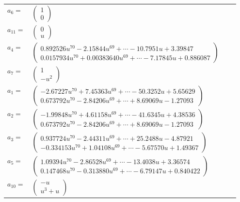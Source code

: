 \documentclass[1p]{elsarticle_modified}
\theoremstyle{definition}
\begin{document}
\begin{tabular}{m{7pt} m{180pt} m{7pt} m{180pt} }
\flushright $a_{6}=$&$\begin{pmatrix}1\\0\end{pmatrix}$ \\
\flushright $a_{11}=$&$\begin{pmatrix}0\\u\end{pmatrix}$ \\
\flushright $a_{4}=$&$\begin{pmatrix}0.892526 u^{70}-2.15844 u^{69}+\cdots-10.7951 u+3.39847\\0.0157934 u^{70}+0.00383640 u^{69}+\cdots-7.17845 u+0.886087\end{pmatrix}$ \\
\flushright $a_{7}=$&$\begin{pmatrix}1\\- u^2\end{pmatrix}$ \\
\flushright $a_{1}=$&$\begin{pmatrix}-2.67227 u^{70}+7.45363 u^{69}+\cdots-50.3252 u+5.65629\\0.673792 u^{70}-2.84206 u^{69}+\cdots+8.69069 u-1.27093\end{pmatrix}$ \\
\flushright $a_{2}=$&$\begin{pmatrix}-1.99848 u^{70}+4.61158 u^{69}+\cdots-41.6345 u+4.38536\\0.673792 u^{70}-2.84206 u^{69}+\cdots+8.69069 u-1.27093\end{pmatrix}$ \\
\flushright $a_{3}=$&$\begin{pmatrix}0.937724 u^{70}-2.44311 u^{69}+\cdots+25.2488 u-4.87921\\-0.334153 u^{70}+1.04108 u^{69}+\cdots-5.67570 u+1.49367\end{pmatrix}$ \\
\flushright $a_{5}=$&$\begin{pmatrix}1.09394 u^{70}-2.86528 u^{69}+\cdots-13.4038 u+3.36574\\0.147468 u^{70}-0.313880 u^{69}+\cdots-6.79147 u+0.840422\end{pmatrix}$ \\
\flushright $a_{10}=$&$\begin{pmatrix}- u\\u^3+u\end{pmatrix}$ \\

\end{tabular}
\end{document}

